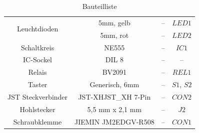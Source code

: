 \documentclass[a4paper, 12pt]{article}
\begin{document}
\begin{table}[H]
\begin{center}
\begin{tabular}{@{}cccc@{}}
        \multirow{2}{*}{Leuchtdioden}  & 5mm, gelb                        & –                           & $LED1$              \\
                                       & 5mm, rot                         & –                           & $LED2$              \\ \midrule
        Schaltkreis                    & NE555                            & –                           & $IC1$              \\ \midrule
        IC-Sockel                  & DIL 8              & –                           & –              \\ \midrule
        Relais                         & BV2091                           & –                           & $REL1$             \\ \midrule
        Taster                         & Generisch, 6mm                   & –                           & $S1$, $S2$        \\ \midrule
        JST Steckverbinder             & JST-XHJST\_XH 7-Pin              & –                           & $CON2$              \\ \midrule
        Hohlstecker                    & 5,5 mm x 2,1 mm                  & –                           & $J2$                \\ \midrule
        Schraubklemme                  & JIEMIN JM2EDGV-R508              & –                           & $CON1$              \\ \bottomrule
      \end{tabular}
    \end{center}
    \caption{Bauteilliste}
    \end{table}
\end{document}
